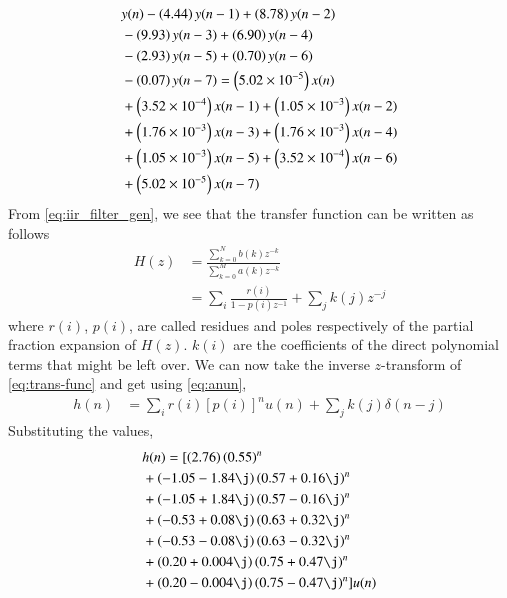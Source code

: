 \documentclass[journal,12pt,twocolumn]{IEEEtran}
\renewcommand\thesection{\arabic{section}}
\begin{document}
\begin{enumerate}[label=\thesection.\arabic*]
	\begin{align}
		&y(n) - \left(4.44\right)y(n - 1) + \left(8.78\right)y(n - 2) \nonumber \\
		&- \left(9.93\right)y(n - 3) + \left(6.90\right)y(n - 4) \nonumber \\
		&- \left(2.93\right)y(n - 5) \nonumber + \left(0.70\right)y(n - 6) \nonumber \\
		&- \left(0.07\right)y(n - 7) = \left(5.02 \times 10^{-5}\right)x(n) \nonumber \\
		&+ \left(3.52 \times 10^{-4}\right)x(n - 1) + \left(1.05 \times 10^{-3}\right)x(n - 2) \nonumber \\
		&+ \left(1.76 \times 10^{-3}\right)x(n - 3) + \left(1.76 \times 10^{-3}\right)x(n - 4) \nonumber \\
		&+ \left(1.05 \times 10^{-3}\right)x(n - 5) + \left(3.52 \times 10^{-4}\right)x(n - 6) \nonumber \\
		&+ \left(5.02 \times 10^{-5}\right)x(n - 7)
	\end{align}
	From \eqref{eq:iir_filter_gen}, we see that the transfer function can be written as follows
	\begin{align}
		H(z) &= \frac{\sum_{k = 0}^{N}b(k)z^{-k}}{\sum_{k = 0}^{M}a(k)z^{-k}} \\
		&= \sum_{i}\frac{r(i)}{1 - p(i)z^{-1}} + \sum_{j}k(j)z^{-j}
		\label{eq:trans-func}
	\end{align}
	where $r(i)$, $p(i)$, are called residues and poles respectively of the partial 
	fraction expansion of $H(z)$. $k(i)$ are the coefficients of the direct polynomial 
	terms that might be left over. We can now take the inverse $z$-transform of
	\eqref{eq:trans-func} and get using \eqref{eq:anun},
	\begin{align}
		h(n) &= \sum_{i}r(i)[p(i)]^nu(n) + \sum_{j}k(j)\delta(n - j)
		\label{eq:h-n-expr}
	\end{align}
	Substituting the values,
	\begin{align}
		&h(n) = [\brak{2.76}\brak{0.55}^n \nonumber \\ 
		&+ \brak{-1.05-1.84\j}\brak{0.57+0.16\j}^n \nonumber \\
		&+ \brak{-1.05+1.84\j}\brak{0.57-0.16\j}^n \nonumber \\
		&+ \brak{-0.53+0.08\j}\brak{0.63+0.32\j}^n \nonumber \\
		&+ \brak{-0.53-0.08\j}\brak{0.63-0.32\j}^n \nonumber \\
		&+ \brak{0.20+0.004\j}\brak{0.75+0.47\j}^n \nonumber \\
		&+ \brak{0.20-0.004\j}\brak{0.75-0.47\j}^n]u(n) \nonumber \\

\end{align}
\end{enumerate}
\end{document}
